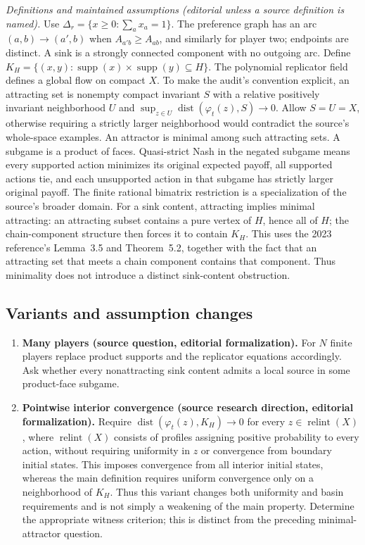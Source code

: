 \documentclass[11pt,a4paper]{article}
\begin{document}
\emph{Definitions and maintained assumptions (editorial unless a source definition is named).} Use \(\Delta_r=\{x\ge0:\sum_a x_a=1\}\). The preference graph has an arc \((a,b)\to(a',b)\) when \(A_{a'b}\ge A_{ab}\), and similarly for player two; endpoints are distinct. A sink is a strongly connected component with no outgoing arc. Define \(K_H=\{(x,y):\operatorname{supp}(x)\times\operatorname{supp}(y)\subseteq H\}\). The polynomial replicator field defines a global flow on compact \(X\). To make the audit’s convention explicit, an attracting set is nonempty compact invariant \(S\) with a relative positively invariant neighborhood \(U\) and \(\sup_{z\in U}\operatorname{dist}(\varphi_t(z),S)\to0\). Allow \(S=U=X\), otherwise requiring a strictly larger neighborhood would contradict the source’s whole-space examples. An attractor is minimal among such attracting sets. A subgame is a product of faces. Quasi-strict Nash in the negated subgame means every supported action minimizes its original expected payoff, all supported actions tie, and each unsupported action in that subgame has strictly larger original payoff. The finite rational bimatrix restriction is a specialization of the source’s broader domain. For a sink content, attracting implies minimal attracting: an attracting subset contains a pure vertex of \(H\), hence all of \(H\); the chain-component structure then forces it to contain \(K_H\). This uses the 2023 reference's Lemma~3.5 and Theorem~5.2, together with the fact that an attracting set that meets a chain component contains that component. Thus minimality does not introduce a distinct sink-content obstruction.
\subsection*{Variants and assumption changes}
\begin{enumerate}
\item \textbf{Many players (source question, editorial formalization).} For \(N\) finite players replace product supports and the replicator equations accordingly. Ask whether every nonattracting sink content admits a local source in some product-face subgame.
\item \textbf{Pointwise interior convergence (source research direction, editorial formalization).} Require \(\operatorname{dist}(\varphi_t(z),K_H)\to0\) for every \(z\in\operatorname{relint}(X)\), where \(\operatorname{relint}(X)\) consists of profiles assigning positive probability to every action, without requiring uniformity in \(z\) or convergence from boundary initial states. This imposes convergence from all interior initial states, whereas the main definition requires uniform convergence only on a neighborhood of \(K_H\). Thus this variant changes both uniformity and basin requirements and is not simply a weakening of the main property. Determine the appropriate witness criterion; this is distinct from the preceding minimal-attractor question.
\end{enumerate}
\end{document}
